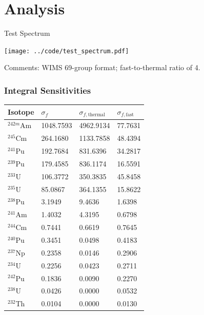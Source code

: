 \documentclass[fleqn]{beamer}
\begin{document}
    \section{Analysis}
    
    \begin{frame}{Test Spectrum}
         \begin{center}
             \texttt{[image: ../code/test\_spectrum.pdf]}
         \end{center}
         Comments: WIMS 69-group format; fast-to-thermal ratio of 4.
    \end{frame}

    \begin{frame}
       \frametitle{Integral Sensitivities}
    
    \small
        \begin{table}
            \begin{tabular}{llll}
                \toprule
                Isotope & $\sigma_f$ & $\sigma_{f,\text{thermal}}$ & $\sigma_{f, \text{fast}}$ \\ 
                \hline
 ${}^{242m}$Am & 1048.7593 &  4962.9134 &  77.7631\\
 ${}^{245}$Cm & 264.1680 &  1133.7858 &  48.4394\\
 \hline
 ${}^{241}$Pu & 192.7684 &  831.6396 &  34.2817\\
 ${}^{239}$Pu & 179.4585 &  836.1174 &  16.5591\\
 ${}^{233}$U & 106.3772 &  350.3835 &  45.8458\\
 ${}^{235}$U & 85.0867 &  364.1355 &  15.8622\\
 \hline
 ${}^{238}$Pu & 3.1949 &  9.4636 &  1.6398\\
 ${}^{241}$Am & 1.4032 &  4.3195 &  0.6798\\
 ${}^{244}$Cm & 0.7441 &  0.6619 &  0.7645\\
 \hline
 ${}^{240}$Pu & 0.3451 &  0.0498 &  0.4183\\
 ${}^{237}$Np & 0.2358 &  0.0146 &  0.2906\\
 ${}^{234}$U & 0.2256 &  0.0423 &  0.2711\\
 ${}^{242}$Pu & 0.1836 &  0.0090 &  0.2270\\
 \hline
 ${}^{238}$U & 0.0426 &  0.0000 &  0.0532\\
 ${}^{232}$Th & 0.0104 &  0.0000 &  0.0130\\
                \bottomrule
            \end{tabular}
        \end{table}
        
    \end{frame}
    
\end{document}
